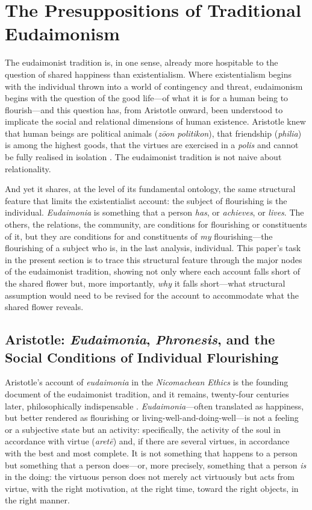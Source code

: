 \section{The Presuppositions of Traditional Eudaimonism}
\label{p14:sec:eudaimonia}

\noindent
The eudaimonist tradition is, in one sense, already more hospitable to the question of shared happiness than existentialism. Where existentialism begins with the individual thrown into a world of contingency and threat, eudaimonism begins with the question of the good life---of what it is for a human being to flourish---and this question has, from Aristotle onward, been understood to implicate the social and relational dimensions of human existence. Aristotle knew that human beings are political animals (\emph{z\={o}on politikon}), that friendship (\emph{philia}) is among the highest goods, that the virtues are exercised in a \emph{polis} and cannot be fully realised in isolation \parencite{aristotle2000}. The eudaimonist tradition is not naive about relationality.

And yet it shares, at the level of its fundamental ontology, the same structural feature that limits the existentialist account: the subject of flourishing is the individual. \emph{Eudaimonia} is something that a person \emph{has}, or \emph{achieves}, or \emph{lives}. The others, the relations, the community, are conditions for flourishing or constituents of it, but they are conditions for and constituents of \emph{my} flourishing---the flourishing of a subject who is, in the last analysis, individual. This paper's task in the present section is to trace this structural feature through the major nodes of the eudaimonist tradition, showing not only where each account falls short of the shared flower but, more importantly, \emph{why} it falls short---what structural assumption would need to be revised for the account to accommodate what the shared flower reveals.

\subsection{Aristotle: \emph{Eudaimonia}, \emph{Phronesis}, and the Social Conditions of Individual Flourishing}
\label{p14:subsec:aristotle}

\noindent
Aristotle's account of \emph{eudaimonia} in the \emph{Nicomachean Ethics} is the founding document of the eudaimonist tradition, and it remains, twenty-four centuries later, philosophically indispensable \parencite{aristotle2000}. \emph{Eudaimonia}---often translated as happiness, but better rendered as flourishing or living-well-and-doing-well---is not a feeling or a subjective state but an activity: specifically, the activity of the soul in accordance with virtue (\emph{aret\={e}}) and, if there are several virtues, in accordance with the best and most complete. It is not something that happens to a person but something that a person does---or, more precisely, something that a person \emph{is} in the doing: the virtuous person does not merely act virtuously but acts from virtue, with the right motivation, at the right time, toward the right objects, in the right manner.

